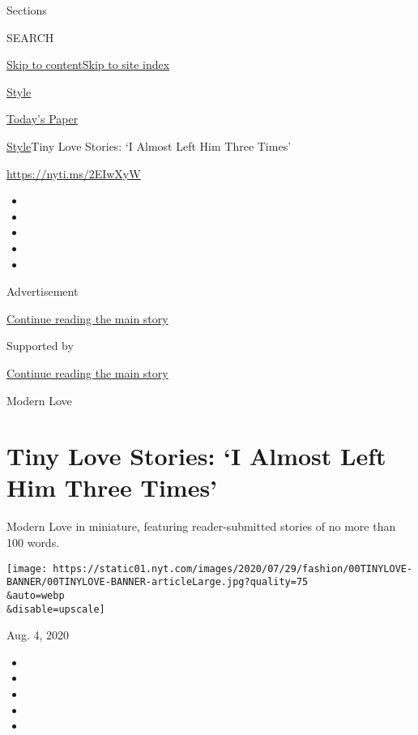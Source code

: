 Sections

SEARCH

\protect\hyperlink{site-content}{Skip to
content}\protect\hyperlink{site-index}{Skip to site index}

\href{https://www.nytimes.com/section/style}{Style}

\href{https://myaccount.nytimes.com/auth/login?response_type=cookie\&client_id=vi}{}

\href{https://www.nytimes.com/section/todayspaper}{Today's Paper}

\href{/section/style}{Style}\textbar{}Tiny Love Stories: `I Almost Left
Him Three Times'

\url{https://nyti.ms/2EIwXyW}

\begin{itemize}
\item
\item
\item
\item
\item
\end{itemize}

Advertisement

\protect\hyperlink{after-top}{Continue reading the main story}

Supported by

\protect\hyperlink{after-sponsor}{Continue reading the main story}

Modern Love

\hypertarget{tiny-love-stories-i-almost-left-him-three-times}{%
\section{Tiny Love Stories: `I Almost Left Him Three
Times'}\label{tiny-love-stories-i-almost-left-him-three-times}}

Modern Love in miniature, featuring reader-submitted stories of no more
than 100 words.

\texttt{[image: https://static01.nyt.com/images/2020/07/29/fashion/00TINYLOVE-BANNER/00TINYLOVE-BANNER-articleLarge.jpg?quality=75\\\&auto=webp\\\&disable=upscale]}

Aug. 4, 2020

\begin{itemize}
\item
\item
\item
\item
\item
\end{itemize}

